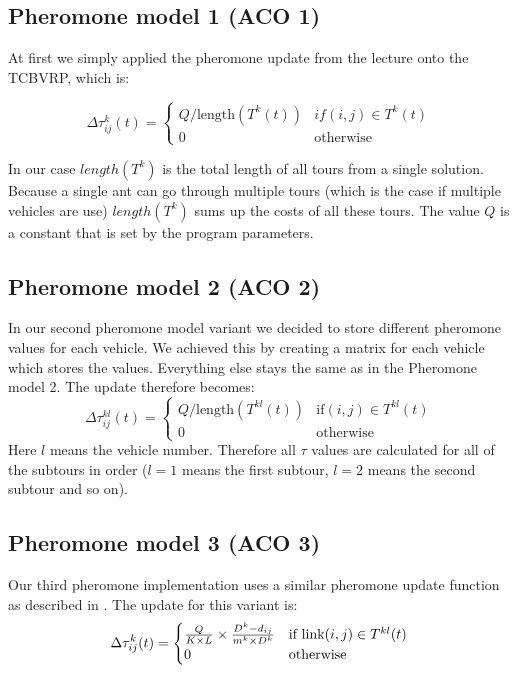 \documentclass[a4paper]{scrartcl}
\begin{document}
\subsection{Pheromone model 1 (ACO 1)}
At first we simply applied the pheromone update from the lecture onto the TCBVRP, which is:

\begin{equation}
  \Delta \tau_{ij}^k(t) = \begin{cases}
    Q / \text{length}(T^k(t)) & if(i,j) \in T^k(t) \\
    0 & \text{otherwise}
  \end{cases} 
\end{equation}

In our case $length(T^k)$ is the total length of all tours from a single solution. Because a single ant can go through multiple tours (which is the case if multiple vehicles are use) $length(T^k)$ sums up the costs of all these tours.
The value $Q$ is a constant that is set by the program parameters.

\subsection{Pheromone model 2 (ACO 2)}

In our second pheromone model variant we decided to store different pheromone values for each vehicle. We achieved this by creating a matrix for each vehicle which stores the values. Everything else stays the same as in the Pheromone model 2.
The update therefore becomes:
\begin{equation}
  \Delta \tau_{ij}^{kl}(t) = \begin{cases}
    Q / \text{length}(T^{kl}(t)) & \text{if}(i,j) \in T^{kl}(t) \\
    0 & \text{otherwise}
  \end{cases} 
\end{equation}
Here $l$ means the vehicle number. Therefore all $\tau$ values are calculated for all of the subtours in order ($l=1$ means the first subtour, $l=2$ means the second subtour and so on).


\subsection{Pheromone model 3 (ACO 3)}

Our third pheromone implementation uses a similar pheromone update function as described in \cite{Yu2009171}.
The update for this variant is:
\begin{equation}
  \Delta \tau_{ij}^k(t) = \begin{cases}
    {Q \over {K \times L}} \times {{D^k - d_{ij}} \over {m^k \times D^k}} & \text{if link} (i,j)  \in T^{kl}(t) \\
    0 & \text{otherwise}
  \end{cases} 
\end{equation}
\end{document}
